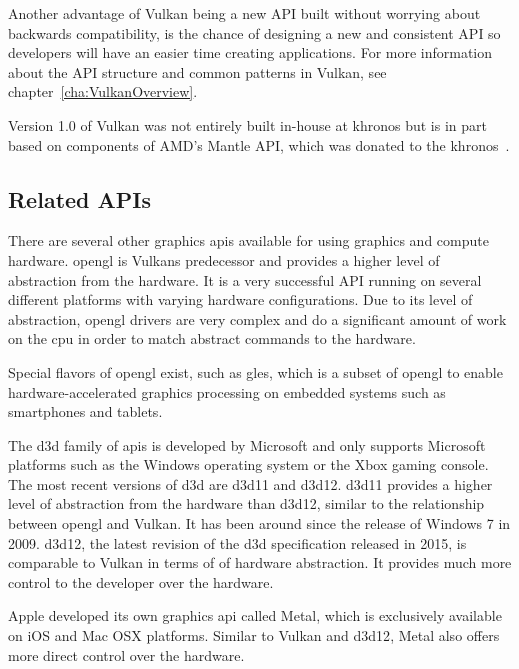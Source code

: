     Another advantage of Vulkan being a new API built without worrying about backwards compatibility, is the chance of designing a new and consistent API so developers will have an easier time creating applications.
    For more information about the API structure and common patterns in Vulkan, see chapter~\ref{cha:VulkanOverview}.

    Version 1.0 of Vulkan was not entirely built in-house at \gls{khronos} but is in part based on components of AMD's Mantle API, which was donated to the \gls{khronos}~\cite{vksessiongdc15}.


    \subsection{Related APIs}
      There are several other graphics \glspl{api} available for using graphics and compute hardware.
      \gls{opengl} is Vulkans predecessor and provides a higher level of abstraction from the hardware.
      It is a very successful API running on several different platforms with varying hardware configurations.
      Due to its level of abstraction, \gls{opengl} drivers are very complex and do a significant amount of work on the \gls{cpu} in order to match abstract commands to the hardware.

      Special flavors of \gls{opengl} exist, such as \gls{gles}, which is a subset of \gls{opengl} to enable hardware-accelerated graphics processing on embedded systems such as smartphones and tablets.

      The \gls{d3d} family of \glspl{api} is developed by Microsoft and only supports Microsoft platforms such as the Windows operating system or the Xbox gaming console.
      The most recent versions of \gls{d3d} are \gls{d3d11} and \gls{d3d12}.
      \gls{d3d11} provides a higher level of abstraction from the hardware than \gls{d3d12}, similar to the relationship between \gls{opengl} and Vulkan.
      It has been around since the release of Windows 7 in 2009.
      \gls{d3d12}, the latest revision of the \gls{d3d} specification released in 2015, is comparable to Vulkan in terms of of hardware abstraction.
      It provides much more control to the developer over the hardware.

      Apple developed its own graphics \gls{api} called Metal, which is exclusively available on iOS and Mac OSX platforms.
      Similar to Vulkan and \gls{d3d12}, Metal also offers more direct control over the hardware.

